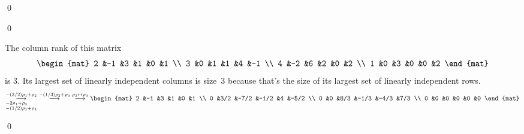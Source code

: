 \documentclass[10pt,t,serif,professionalfont]{beamer}
\begin{document}
\begin{frame}
\lm[le:RowOpsNoChngColRnk]

\pause
\pf
{}
\qed
\end{frame}




\begin{frame}
\th[th:RowRankEqualsColumnRank]

\pause
\pf
{}

\pause
{}
\qed

\pause
\df[df:Rank]
\end{frame}




\begin{frame}
\ex
The column rank of this matrix 
\begin{equation*}
  \begin{mat}
    2 &-1 &3 &1 &0 &1  \\
    3 &0  &1 &1 &4 &-1 \\
    4 &-2 &6 &2 &0 &2  \\
    1 &0  &3 &0 &0 &2 
  \end{mat}
\end{equation*}
is $3$.  
Its largest set of linearly independent columns is size~$3$
because that's the size of its largest set of linearly independent rows.
\begin{equation*}
  \grstep[-2\rho_1+\rho_3 \\ -(1/2)\rho_1+\rho_4]{-(3/2)\rho_1+\rho_2}
  \;\grstep{-(1/3)\rho_2+\rho_4}
  \;\grstep{\rho_3\leftrightarrow\rho_4}
  \begin{mat}
    2 &-1   &3    &1    &0     &1    \\
    0 &3/2  &-7/2 &-1/2 &4     &-5/2 \\
    0 &0    &8/3  &-1/3 &-4/3  &7/3   \\
    0 &0    &0    &0    &0     &0 
  \end{mat}
\end{equation*}
\end{frame}



\begin{frame}
\th[th:RankVsSoltnSp]

\pause
\pf
{}
\qed
\end{frame}
\end{document}
